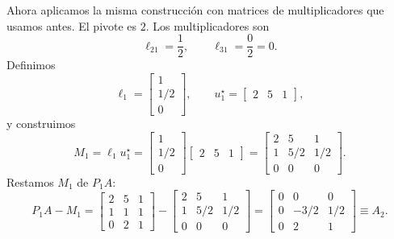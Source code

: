 Ahora aplicamos la misma construcción con matrices de multiplicadores que usamos antes. El pivote es $2$. Los multiplicadores son
\[
\ell_{21} = \frac{1}{2}, \qquad \ell_{31} = \frac{0}{2} = 0.
\]
Definimos
\[
\ell_1 = \begin{bmatrix} 1 \\ 1/2 \\ 0 \end{bmatrix}, \qquad
u_1^\star = \begin{bmatrix} 2 & 5 & 1 \end{bmatrix},
\]
y construimos
\[
M_1 = \ell_1 u_1^\star =
\begin{bmatrix} 1 \\ 1/2 \\ 0 \end{bmatrix}
\begin{bmatrix} 2 & 5 & 1 \end{bmatrix}
=
\begin{bmatrix}
2 & 5 & 1 \\
1 & 5/2 & 1/2 \\
0 & 0 & 0
\end{bmatrix}.
\]
Restamos $M_1$ de $P_1A$:
\[
P_1A - M_1 =
\begin{bmatrix}
2 & 5 & 1 \\
1 & 1 & 1 \\
0 & 2 & 1
\end{bmatrix}
-
\begin{bmatrix}
2 & 5 & 1 \\
1 & 5/2 & 1/2 \\
0 & 0 & 0
\end{bmatrix}
=
\begin{bmatrix}
0 & 0 & 0 \\
0 & -3/2 & 1/2 \\
0 & 2 & 1
\end{bmatrix}
\equiv A_2.
\]

